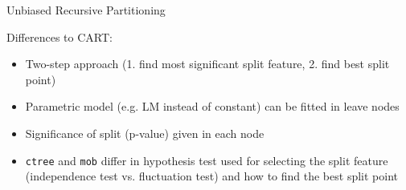 \documentclass[11pt,compress,t,notes=noshow, aspectratio=169, xcolor=table]{beamer}
\begin{document}
\begin{frame}{Unbiased Recursive Partitioning}

Differences to CART:
\begin{itemize}
    \item Two-step approach (1. find most significant split feature, 2. find best split point)
    \item Parametric model (e.g. LM instead of constant) can be fitted in leave nodes %
    \item Significance of split (p-value) given in each node
    \item \texttt{ctree} and \texttt{mob} differ in hypothesis test used for selecting the split feature (independence test vs. fluctuation test) and how to find the best split point
\end{itemize}

\medskip


\end{frame}
\end{document}
